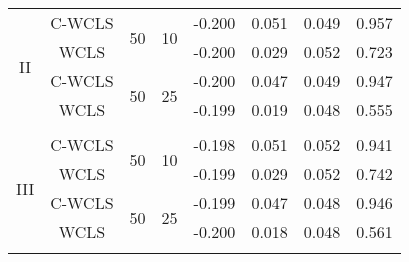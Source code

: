 \documentclass[lineno]{biometrika}
\begin{document}
\begin{table}[!th]
{\begin{tabular}{c ccccccc}
\multirow{4}{*}{II} 
& C-WCLS & \multirow{2}{*}{50} & \multirow{2}{*}{10} & -0.200 & 0.051 & 0.049 & 0.957 \\
& WCLS & & &  -0.200 & 0.029 & 0.052 & 0.723 \\ %
& C-WCLS & \multirow{2}{*}{50} & \multirow{2}{*}{25} & -0.200 & 0.047 & 0.049 & 0.947 \\
& WCLS & & &  -0.199 & 0.019 & 0.048 & 0.555 \\ %
&  & & &   &  &  &  \\
\multirow{4}{*}{III} 
& C-WCLS & \multirow{2}{*}{50} & \multirow{2}{*}{10} & -0.198 & 0.051 & 0.052 & 0.941 \\
& WCLS & & &  -0.199 & 	0.029 & 0.052 & 0.742 \\ %
& C-WCLS & \multirow{2}{*}{50} & \multirow{2}{*}{25} & -0.199 & 0.047 & 0.048 & 0.946 \\
& WCLS & & &  -0.200 & 0.018 & 0.048 & 0.561 \\%
&  & & &   &  &  &  \\

\end{tabular}}
\end{table}
\end{document}
